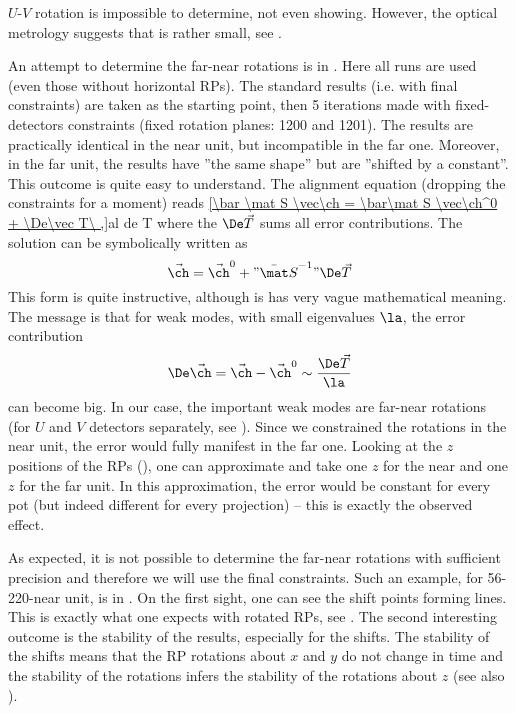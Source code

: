 $U$-$V$ rotation is impossible to determine, not even showing. However, the optical metrology suggests that is rather small, see .

An attempt to determine the far-near rotations is in . Here all runs are used (even those without horizontal RPs). The standard results (i.e. with final constraints) are taken as the starting point, then 5 iterations made with fixed-detectors constraints (fixed rotation planes: 1200 and 1201). The results are practically identical in the near unit, but incompatible in the far one. Moreover, in the far unit, the results have ''the same shape'' but are ''shifted by a constant''. This outcome is quite easy to understand. The alignment equation  (dropping the constraints for a moment) reads
\eqref{\bar \mat S \vec\ch = \bar\mat S \vec\ch^0 + \De\vec T\ ,}{al de T}
where the $\De\vec T$ sums all error contributions. The solution can be symbolically written as
$$\vec\ch = \vec\ch^0 + " {\bar\mat S}^{-1} " \De \vec T$$
This form is quite instructive, although is has very vague mathematical meaning. The message is that for weak modes, with small eigenvalues $\la$, the error contribution
$$\De\vec\ch = \vec\ch - \vec\ch^0 \sim {\De\vec T\over\la}$$
can become big. In our case, the important weak modes are far-near rotations (for $U$ and $V$ detectors separately, see ). Since we constrained the rotations in the near unit, the error would fully manifest in the far one. Looking at the $z$ positions of the RPs (), one can approximate and take one $z$ for the near and one $z$ for the far unit. In this approximation, the error would be constant for every pot (but indeed different for every projection) -- this is exactly the observed effect.


As expected, it is not possible to determine the far-near rotations with sufficient precision and therefore we will use the final constraints. Such an example, for 56-220-near unit, is in . On the first sight, one can see the shift points forming lines. This is exactly what one expects with rotated RPs, see . The second interesting outcome is the stability of the results, especially for the shifts. The stability of the shifts means that the RP rotations about $x$ and $y$ do not change in time and the stability of the rotations infers the stability of the rotations about $z$ (see also ). 


